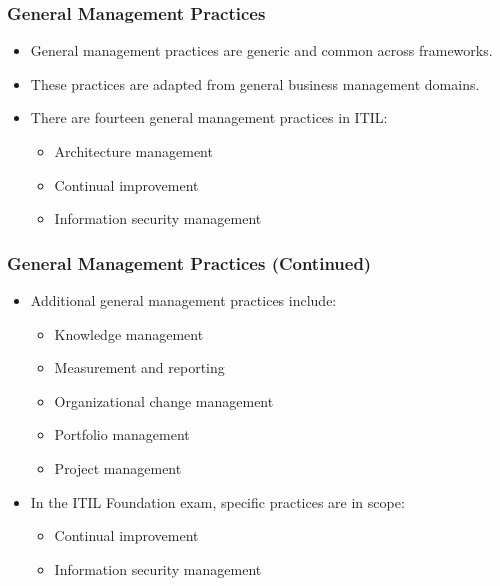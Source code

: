 \documentclass[aspectratio=169, table]{beamer}
\begin{document}
\begin{frame}
	\frametitle{General Management Practices}
	
	\begin{itemize}
		\item General management practices are generic and common across frameworks.
		\item These practices are adapted from general business management domains.
		\item There are fourteen general management practices in ITIL:
		\begin{itemize}
			\item Architecture management
			\item Continual improvement
			\item Information security management
		\end{itemize}
	\end{itemize}
	
\end{frame}

\begin{frame}
	\frametitle{General Management Practices (Continued)}
	
	\begin{itemize}
		\item Additional general management practices include:
		\begin{itemize}
			\item Knowledge management
			\item Measurement and reporting
			\item Organizational change management
			\item Portfolio management
			\item Project management
		\end{itemize}
		\item In the ITIL Foundation exam, specific practices are in scope:
		\begin{itemize}
			\item Continual improvement
			\item Information security management
		\end{itemize}
	\end{itemize}
	
\end{frame}
\end{document}
